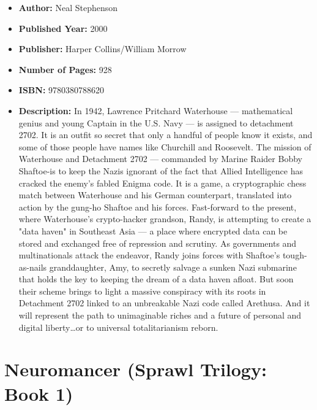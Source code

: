 \documentclass{tufte-handout}
\begin{document}
\begin{itemize}
    \item[] \textbf{Author:} Neal Stephenson
    \item[] \textbf{Published Year:} 2000
    \item[] \textbf{Publisher:} Harper Collins/William Morrow
    \item[] \textbf{Number of Pages:} 928
    \item[] \textbf{ISBN:} 9780380788620
    \item[] \textbf{Description:} In 1942, Lawrence Pritchard Waterhouse --- mathematical genius and young Captain in the U.S. Navy --- is assigned to detachment 2702. It is an outfit so secret that only a handful of people know it exists, and some of those people have names like Churchill and Roosevelt. The mission of Waterhouse and Detachment 2702 --- commanded by Marine Raider Bobby Shaftoe-is to keep the Nazis ignorant of the fact that Allied Intelligence has cracked the enemy's fabled Enigma code. It is a game, a cryptographic chess match between Waterhouse and his German counterpart, translated into action by the gung-ho Shaftoe and his forces. Fast-forward to the present, where Waterhouse's crypto-hacker grandson, Randy, is attempting to create a "data haven" in Southeast Asia --- a place where encrypted data can be stored and exchanged free of repression and scrutiny. As governments and multinationals attack the endeavor, Randy joins forces with Shaftoe's tough-as-nails granddaughter, Amy, to secretly salvage a sunken Nazi submarine that holds the key to keeping the dream of a data haven afloat. But soon their scheme brings to light a massive conspiracy with its roots in Detachment 2702 linked to an unbreakable Nazi code called Arethusa. And it will represent the path to unimaginable riches and a future of personal and digital liberty\ldots or to universal totalitarianism reborn.
\end{itemize}

\section*{Neuromancer (Sprawl Trilogy: Book 1)}
\end{document}
